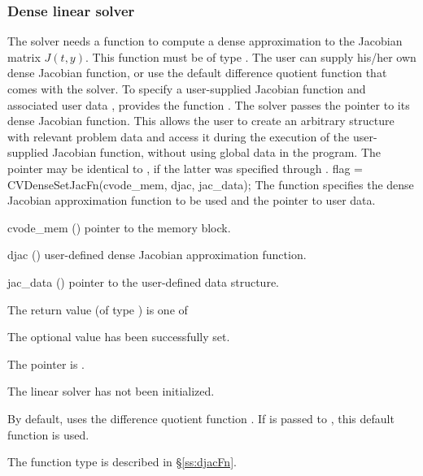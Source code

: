 \subsubsection{Dense linear solver}\label{sss:optin_dense}
The 
{\cvdense} solver needs a function to compute a dense approximation to
the Jacobian matrix $J(t,y)$.  This function must be of type . 
The user can supply his/her own dense Jacobian function, or use the default 
difference quotient function  
that comes with the {\cvdense} solver.
To specify a user-supplied Jacobian function  and associated user 
data , {\cvdense} provides the function .
The {\cvdense} solver passes the pointer  
to its dense Jacobian function. This allows the user to
create an arbitrary structure with relevant problem data and access it
during the execution of the user-supplied Jacobian function, without
using global data in the program.  The pointer  may be
identical to , if the latter was specified through .
{
  flag = CVDenseSetJacFn(cvode\_mem, djac, jac\_data);
}
{
  The function  specifies the dense Jacobian
  approximation function to be used and the pointer to user data.
}
{
  \begin{args}
  \item[cvode\_mem] ()
    pointer to the {\cvodes} memory block.
  \item[djac] ()
    user-defined dense Jacobian approximation function.
  \item[jac\_data] ()
    pointer to the user-defined data structure.
  \end{args}
}
{
  The return value  (of type ) is one of
  \begin{args}
  \item[\Id{CVDENSE\_SUCCESS}] 
    The optional value has been successfully set.
  \item[\Id{CVDENSE\_MEM\_NULL}]
    The  pointer is .
  \item[\Id{CVDENSE\_LMEM\_NULL}]
    The {\cvdense} linear solver has not been initialized.
  \end{args}
}
{
  By default, {\cvdense} uses the difference quotient function .
  If  is passed to , this default function is used.

  The function type  is described in \S\ref{ss:djacFn}.
}


